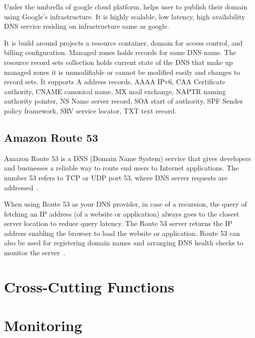      Under the umbrella of google cloud platform, helps user to
     publish their domain using Google's infrastructure. It is highly
     scalable, low latency, high availability DNS service residing on
     infrastructure same as google.
   
     It is build around projects a resource container, domain for
     access control, and billing configuration. Managed zones holds
     records for same DNS name. The resource record sets collection
     holds current state of the DNS that make up managed zones it is
     unmodifiable or cannot be modified easily and changes to record
     sets. It supports  A address records, AAAA IPv6, CAA
     Certificate authority, CNAME canonical name, MX mail
     exchange, NAPTR naming authority pointer, NS Name server
     record, SOA start of authority, SPF Sender policy framework,
     SRV service locator, TXT text record.


     \pv

\subsection{Amazon Route 53}

Amazon Route 53 is a DNS (Domain Name System) service that gives
developers and businesses a reliable way to route end users to
Internet applications. The number 53 refers to TCP or UDP port 53,
where DNS server requests are addressed~\cite{www-ar53}.
     
When using Route 53 as your DNS provider, in case of a recursion, the
query of fetching an IP address (of a website or application) always
goes to the closest server location to reduce query latency. The Route
53 server returns the IP address enabling the browser to load the
website or application. Route 53 can also be used for registering
domain names and arranging DNS health checks to monitor the
server~\cite{www-amar53}.

\section{Cross-Cutting Functions}
\label{S:o-cross-cutting-functions}

\section{Monitoring}

